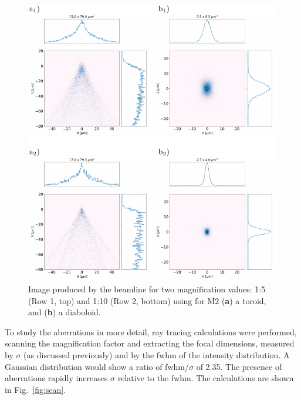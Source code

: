 \documentclass{iucr}       %
\begin{document}
\begin{figure}\label{fig:demagnification}
\includegraphics[width=1.0\textwidth]{figures/fig5.pdf}
% 
% 
\caption{Image produced by the beamline for two magnification values: 1:5 (Row 1, top) and 1:10 (Row 2, bottom) using for M2 (\textbf{a}) a toroid, and (\textbf{b}) a diaboloid.}
\end{figure}

To study the aberrations in more detail, ray tracing calculations were performed, scanning the magnification factor and extracting the focal dimensions, measured by $\sigma$ (as discussed previously) and by the fwhm of the intensity distribution. A Gaussian distribution would show a ratio of fwhm/$\sigma$ of 2.35. The presence of aberrations rapidly increases $\sigma$ relative to the fwhm. The calculations are shown in Fig.~\ref{fig:scan}.
\end{document}
